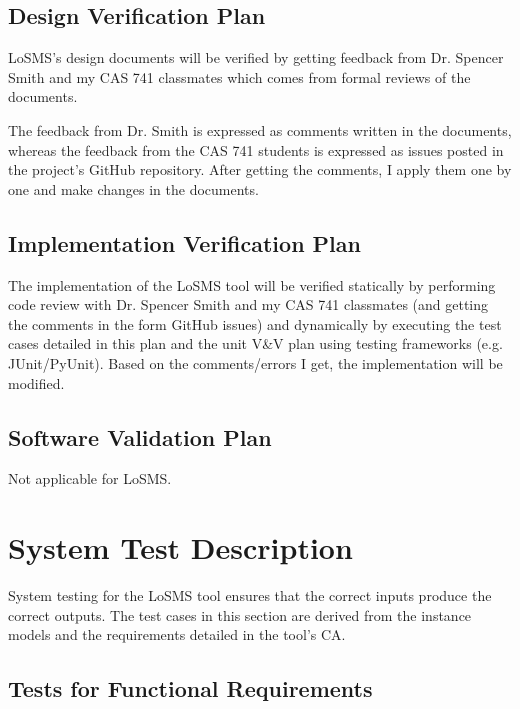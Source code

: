\documentclass[12pt, titlepage]{article}
\newcommand{\famname}{LoSMS} %
\begin{document}
\subsection{Design Verification Plan}

\famname{}'s design documents will be verified by getting feedback from 
Dr. Spencer Smith and my CAS 741 classmates which comes from formal reviews of 
the documents.

The feedback from Dr. Smith is expressed as comments written in the documents, 
whereas the feedback from the CAS 741 students is expressed as issues posted in 
the project's GitHub repository. After getting the comments, I apply them one 
by one and make changes in the documents.

\subsection{Implementation Verification Plan}

The implementation of the \famname{} tool will be verified statically by 
performing code review with Dr. Spencer Smith and my CAS 741 classmates (and 
getting the comments in the form GitHub issues) and dynamically by executing 
the test cases detailed in this plan and the unit V\&V plan using testing 
frameworks (e.g. JUnit/PyUnit). Based on the comments/errors I get, the 
implementation will be modified.
 
\subsection{Software Validation Plan}

Not applicable for \famname{}.

\section{System Test Description} \label{SystemTestDescription}

System testing for the \famname{} tool ensures that the correct inputs produce 
the correct outputs. The test cases in this section are derived from the 
instance models and the requirements detailed in the tool's CA.

\subsection{Tests for Functional Requirements}

\end{document}
